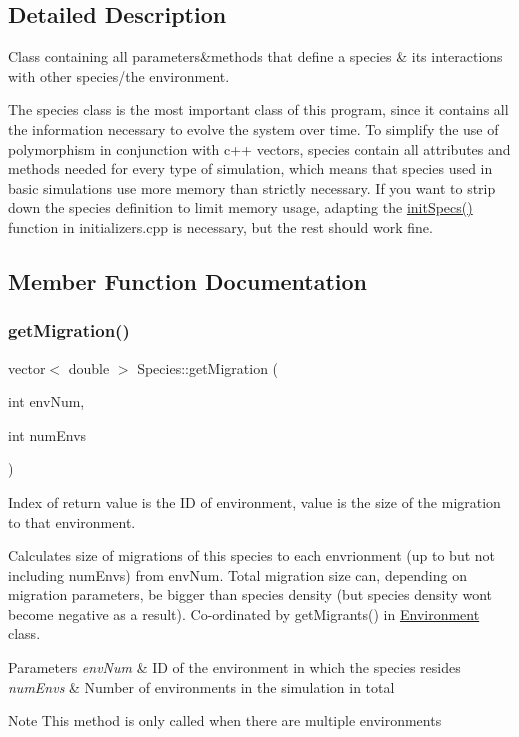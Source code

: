 \subsection{Detailed Description}
Class containing all parameters\&methods that define a species \& it\textquotesingle{}s interactions with other species/the environment. 

The species class is the most important class of this program, since it contains all the information necessary to evolve the system over time. To simplify the use of polymorphism in conjunction with c++ vectors, species contain all attributes and methods needed for every type of simulation, which means that species used in basic simulations use more memory than strictly necessary. If you want to strip down the species definition to limit memory usage, adapting the \hyperlink{initializers_8hpp_a8fd7f8510d1193c0657c5abdd1721e29}{init\+Specs()} function in initializers.\+cpp is necessary, but the rest should work fine. 

\subsection{Member Function Documentation}
\mbox{\label{classSpecies_a306aaa396cc99e223d46a577b14e1faf}} 
\subsubsection{\texorpdfstring{get\+Migration()}{getMigration()}}
{\footnotesize\ttfamily vector$<$ double $>$ Species\+::get\+Migration (\begin{DoxyParamCaption}\item[{int}]{env\+Num,  }\item[{int}]{num\+Envs }\end{DoxyParamCaption})}



Index of return value is the ID of environment, value is the size of the migration to that environment. 

Calculates size of migrations of this species to each envrionment (up to but not including num\+Envs) from env\+Num. Total migration size can, depending on migration parameters, be bigger than species density (but species density won\textquotesingle{}t become negative as a result). Co-\/ordinated by get\+Migrants() in \hyperlink{classEnvironment}{Environment} class. 
\begin{DoxyParams}{Parameters}
{\em env\+Num} & ID of the environment in which the species resides \\
\hline
{\em num\+Envs} & Number of environments in the simulation in total \\
\hline
\end{DoxyParams}
\begin{DoxyNote}{Note}
This method is only called when there are multiple environments 
\end{DoxyNote}


